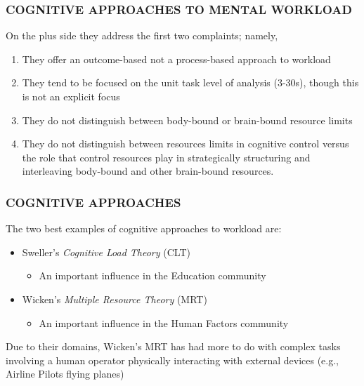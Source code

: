 \documentclass{beamer}
\begin{document}
\begin{frame}
	\frametitle{COGNITIVE APPROACHES TO MENTAL WORKLOAD}
On the plus side they address the first two complaints; namely,
	\begin{enumerate}
		\item They offer an outcome-based not a process-based approach to workload
		\item They tend to be focused on the unit task level of analysis (3-30s), though this is not an explicit focus
	\pause
		\item They do not distinguish between body-bound or brain-bound resource limits
		\item They do not distinguish between resources limits in cognitive control versus the role that control resources play in strategically structuring and interleaving body-bound and other brain-bound resources.
	\end{enumerate}
	\vspace{.7cm}

\end{frame}

\begin{frame}
	\frametitle{COGNITIVE APPROACHES}
	The two best examples of cognitive approaches to workload are:
	\begin{itemize}
		\item Sweller's \emph{Cognitive Load Theory} (CLT) \parencite{chandler96acp,leahy03,leahy11,vanmerri05,sweller88}
		\begin{itemize}
			\item An important influence in the Education community
		\end{itemize}
		\pause
	\listpart{\&}
		\item Wicken's \emph{Multiple Resource Theory} (MRT) \parencite{wickens81,wickens92book,wickens02}
		\begin{itemize}
			\item An important influence in the Human Factors community
		\end{itemize}
	\end{itemize}
\pause
Due to their domains, Wicken's MRT has had more to do with complex tasks involving a human operator physically interacting with external devices (e.g., Airline Pilots flying planes)


\end{frame}
\end{document}
